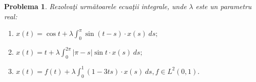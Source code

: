 \documentclass[a4paper,12pt,oneside]{report}
\newtheorem{problem}{Problema}
\begin{document}
\begin{problem}
Rezolva\c{t}i urm\u{a}toarele ecua\c{t}ii integrale, unde \(\lambda\) este un parametru real:
\begin{enumerate}[label=(\alph*)]
  \item \(x\left ( t \right ) = \cos t + \lambda \int_{0}^{\pi }\sin \left ( t-s \right )\cdot x\left ( s \right ) \ ds;\)
  \item \(x\left ( t \right ) =  t + \lambda \int_{0}^{2\pi }\left | \pi - s \right |\sin t \cdot x\left ( s \right ) \ ds;\)
  \item \(x\left ( t \right ) = f \left (t  \right ) + \lambda \int_{0}^{1 }\left ( 1 - 3ts  \right )\cdot x\left ( s \right ) \ ds , f \in L^{2}\left ( 0,1 \right ).\)
\end{enumerate}
\end{problem}
  	      			      			      		
\end{document}
